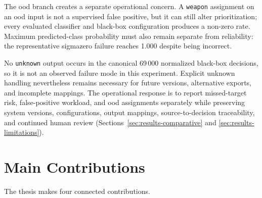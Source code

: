The \gls{ood} branch creates a separate operational concern. A
\texttt{weapon} assignment on an \gls{ood} input is not a supervised false
positive, but it can still alter prioritization; every evaluated classifier and
black-box configuration produces a non-zero rate. Maximum predicted-class
probability must also remain separate from reliability: the representative
\gls{sigmazero} failure reaches 1.000 despite being incorrect.

No \texttt{unknown} output occurs in the canonical 69\,000 normalized
black-box decisions, so it is not an observed failure mode in this experiment.
Explicit unknown handling nevertheless remains necessary for future versions,
alternative exports, and incomplete mappings. The operational response is to
report missed-target risk, false-positive workload, and \gls{ood} assignments
separately while preserving system versions, configurations, output mappings,
source-to-decision traceability, and continued human review
(Sections~\ref{sec:results-comparative} and
\ref{sec:results-limitations}).


\section{Main Contributions}
\label{sec:conclusions-contributions}

The thesis makes four connected contributions.

